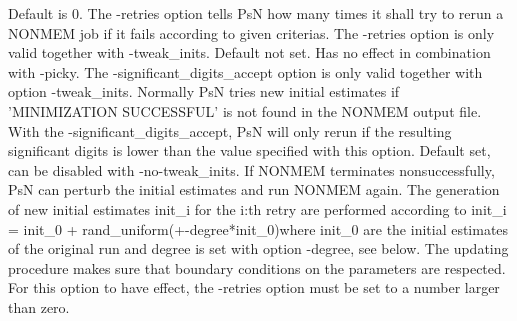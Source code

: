 \begin{optionlist}
\nextopt
{}
Default is 0. The -retries option tells PsN how many times it shall try to rerun a NONMEM job if it fails according to given criterias. The -retries option is only valid together with -tweak\_inits. 
\nextopt
{}
Default not set. Has no effect in combination with -picky. The -significant\_digits\_accept option is only valid together with option -tweak\_inits. Normally PsN tries new initial estimates if 'MINIMIZATION SUCCESSFUL' is not found in the NONMEM output file. With the -significant\_digits\_accept, PsN will only rerun if the resulting significant digits is lower than the value specified with this option. 
\nextopt
{}
Default set, can be disabled with -no-tweak\_inits. 
If NONMEM terminates nonsuccessfully, PsN can perturb the initial estimates and run NONMEM again. The generation of new initial estimates init\_i for the i:th retry are performed according to init\_i = init\_0 + rand\_uniform(+-degree*init\_0)where init\_0 are the initial estimates of the original run and degree is set with option -degree, see below. The updating procedure makes sure that boundary conditions on the parameters are respected. For this option to have effect, the -retries option must be set to a number larger than zero. 
\nextopt
\end{optionlist}
